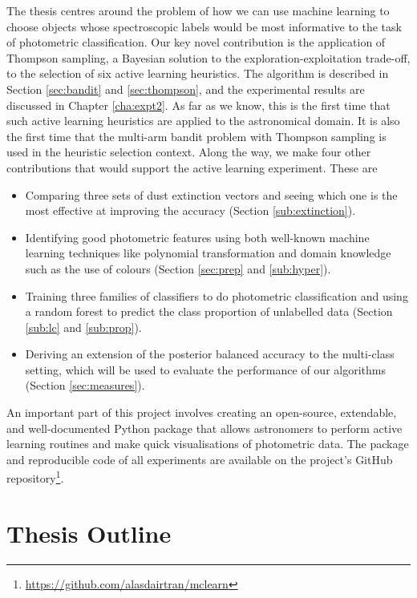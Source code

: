 The thesis centres around the problem of how we can use machine learning to choose objects whose
spectroscopic labels would be most informative to the task of photometric classification. Our key
novel contribution is the application of Thompson sampling, a Bayesian solution to the
exploration-exploitation trade-off, to the selection of six active learning heuristics. The
algorithm is described in Section \ref{sec:bandit} and \ref{sec:thompson}, and the experimental
results are discussed in Chapter \ref{cha:expt2}. As far as we know, this is the first time that
such active learning heuristics are applied to the astronomical domain. It is also the first time
that the multi-arm bandit problem with Thompson sampling is used in the heuristic selection
context. Along the way, we make four other contributions that would support the active learning
experiment. These are
	\begin{itemize}
		\item Comparing three sets of dust extinction vectors and seeing which one is the most
		effective at improving the accuracy (Section \ref{sub:extinction}).
		
		\item Identifying good photometric features using both well-known machine learning techniques
		like polynomial transformation and domain knowledge such as the use of colours (Section
		\ref{sec:prep} and \ref{sub:hyper}).
		
		\item Training three families of classifiers to do photometric classification and using
		a random forest to predict the class proportion of unlabelled data (Section \ref{sub:lc}
		and \ref{sub:prop}).
		
		\item Deriving an extension of the posterior balanced accuracy to the multi-class
		setting, which will be used to evaluate the performance of our algorithms (Section 
		\ref{sec:measures}).
	\end{itemize}
An important part of this project involves creating an open-source, extendable, and well-documented
Python package that allows astronomers to perform active learning routines and make quick
visualisations of photometric data. The package and reproducible code of all experiments are
available on the project's GitHub repository\footnote{
	\url{https://github.com/alasdairtran/mclearn}}.


\section{Thesis Outline}
\label{sec:orgnisation}


